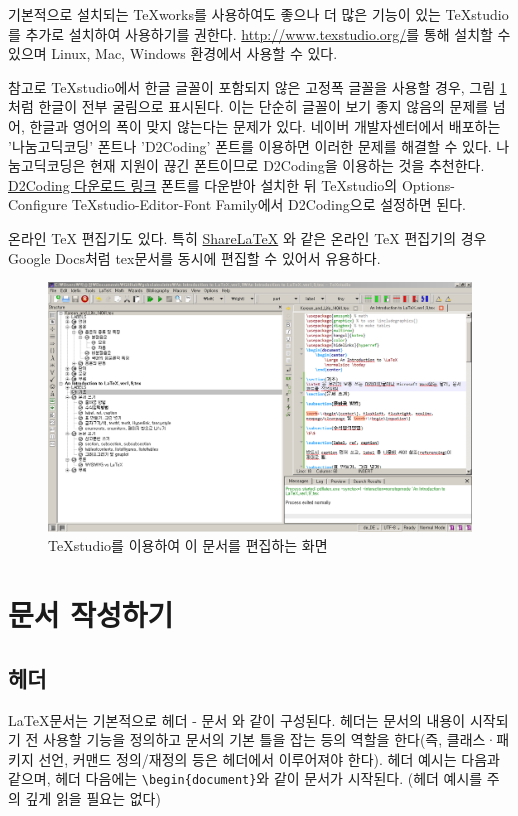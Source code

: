 \documentclass[11pt]{article}
\begin{document}
기본적으로 설치되는 TeXworks를 사용하여도 좋으나 더 많은 기능이 있는 
TeXstudio를 추가로 설치하여 사용하기를 권한다. 
\url{http://www.texstudio.org/}를 통해 설치할 수 있으며 Linux, Mac, Windows 
환경에서 사용할 수 있다.

참고로 TeXstudio에서 한글 글꼴이 포함되지 않은 고정폭 글꼴을 사용할 경우, 그림 
\ref{texstudio}처럼 한글이 전부 굴림으로 표시된다. 이는 단순히 글꼴이 보기 좋지 
않음의 문제를 넘어, 한글과 영어의 폭이 맞지 않는다는 문제가 있다.
네이버 개발자센터에서 배포하는 '나눔고딕코딩' 폰트나 'D2Coding' 폰트를 이용하면 
이러한 문제를 해결할 수 있다. 나눔고딕코딩은 현재 지원이 끊긴 폰트이므로 
D2Coding을 이용하는 것을 추천한다.
\href{http://dev.naver.com/projects/d2coding}{D2Coding 다운로드 링크}
폰트를 다운받아 설치한 뒤 TeXstudio의 Options-Configure TeXstudio-Editor-Font 
Family에서 D2Coding으로 설정하면 된다.

온라인 TeX 편집기도 있다. 특히 \href{https://www.sharelatex.com/}{ShareLaTeX} 와 같은 온라인 TeX 편집기의 경우 Google Docs처럼 tex문서를 동시에 편집할 수 있어서 유용하다.

\begin{figure}
	\begin{center}
		\includegraphics[width=\textwidth]{texstudio.png}
	\end{center}
	\caption{TeXstudio를 이용하여 이 문서를 편집하는 화면}
	\label{texstudio}
\end{figure}

\section{문서 작성하기}

\subsection{헤더}
\LaTeX 문서는 기본적으로 헤더 - 문서 와 같이 구성된다. 헤더는 문서의 내용이 
시작되기 전 사용할 기능을 정의하고 문서의 기본 틀을 잡는 등의 역할을 한다(즉, 
클래스·패키지 선언, 커맨드 정의/재정의 등은 헤더에서 이루어져야 한다).
헤더 예시는 다음과 같으며, 헤더 다음에는 \verb|\begin{document}|와 
같이 문서가 시작된다. (헤더 예시를 주의 깊게 읽을 필요는 없다)
\end{document}
